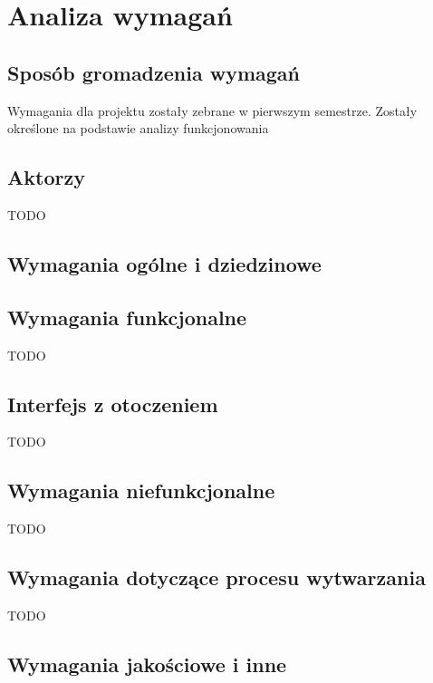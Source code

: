 
\chapter{Analiza wymagań}
\label{ch:analiza-wymagan}

\section{Sposób gromadzenia wymagań}
\label{sec:sposob-gromadzenia-wymagan}

Wymagania dla projektu zostały zebrane w pierwszym semestrze. Zostały określone na podstawie analizy funkcjonowania

\section{Aktorzy}
\label{sec:aktorzy}

TODO

\section{Wymagania ogólne i dziedzinowe}
\label{sec:wymagania-ogolne-i-dziedzinowe}

\begin{requirementstab}[label={tab:requirements:general},caption={Przykładowe wymaganie ogólne lub dziedzinowe}]
\end{requirementstab}

\section{Wymagania funkcjonalne}
\label{sec:wymagania-funkcjonalne}

TODO

\section{Interfejs z otoczeniem}
\label{sec:interfejs-z-otoczeniem}

TODO

\section{Wymagania niefunkcjonalne}
\label{sec:wymagania-niefunkcjonalne}

TODO

\section{Wymagania dotyczące procesu wytwarzania}
\label{sec:wymagania-dotyczace-procesu-wytwarzania}

TODO

\section{Wymagania jakościowe i inne}
\label{sec:wymagania-jakosciowe-i-inne}

